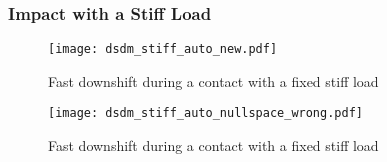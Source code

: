 \subsubsection{Impact with a Stiff Load}


\begin{figure}[H]
	\centering
		\texttt{[image: dsdm\_stiff\_auto\_new.pdf]}
	\caption{ Fast downshift during a contact with a fixed stiff load }
	\label{fig:dsdm_stiff_auto_new}
\end{figure}


\begin{figure}[H]
	\centering
		\texttt{[image: dsdm\_stiff\_auto\_nullspace\_wrong.pdf]}
	\caption{ Fast downshift during a contact with a fixed stiff load }
	\label{fig:dsdm_stiff_auto_nullspace_wrong}
\end{figure}
